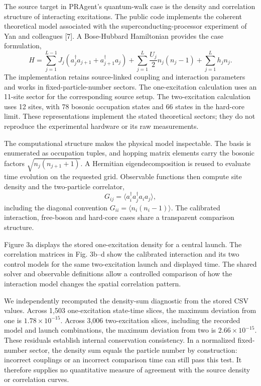 \documentclass[10pt,a4paper]{article}
\begin{document}
The source target in PRAgent's quantum-walk case is the density and
correlation structure of interacting excitations. The public code
implements the coherent theoretical model associated with the
superconducting-processor experiment of Yan and colleagues {[}7{]}. A
Bose-Hubbard Hamiltonian provides the case formulation, \[
H=\sum_{j=1}^{L-1}J_j(a_j^\dagger a_{j+1}+a_{j+1}^\dagger a_j)
+\sum_{j=1}^{L}\frac{U_j}{2}n_j(n_j-1)+\sum_{j=1}^{L}h_jn_j.
\] The implementation retains source-linked coupling and interaction
parameters and works in fixed-particle-number sectors. The
one-excitation calculation uses an 11-site sector for the corresponding
source setup. The two-excitation calculation uses 12 sites, with 78
bosonic occupation states and 66 states in the hard-core limit. These
representations implement the stated theoretical sectors; they do not
reproduce the experimental hardware or its raw measurements.

The computational structure makes the physical model inspectable. The
basis is enumerated as occupation tuples, and hopping matrix elements
carry the bosonic factors \(\sqrt{n_j(n_{j+1}+1)}\). A Hermitian
eigendecomposition is reused to evaluate time evolution on the requested
grid. Observable functions then compute site density and the
two-particle correlator, \[
G_{ij}=\langle a_i^\dagger a_j^\dagger a_i a_j\rangle,
\] including the diagonal convention
\(G_{ii}=\langle n_i(n_i-1)\rangle\). The calibrated interaction,
free-boson and hard-core cases share a transparent comparison structure.

Figure 3a displays the stored one-excitation density for a central
launch. The correlation matrices in Fig. 3b--d show the calibrated
interaction and its two control models for the same two-excitation
launch and displayed time. The shared solver and observable definitions
allow a controlled comparison of how the interaction model changes the
spatial correlation pattern.

We independently recomputed the density-sum diagnostic from the stored
CSV values. Across 1,503 one-excitation state-time slices, the maximum
deviation from one is \(1.78\times10^{-15}\). Across 3,006
two-excitation slices, including the recorded model and launch
combinations, the maximum deviation from two is \(2.66\times10^{-15}\).
These residuals establish internal conservation consistency. In a
normalized fixed-number sector, the density sum equals the particle
number by construction: incorrect couplings or an incorrect comparison
time can still pass this test. It therefore supplies no quantitative
measure of agreement with the source density or correlation curves.
\end{document}
